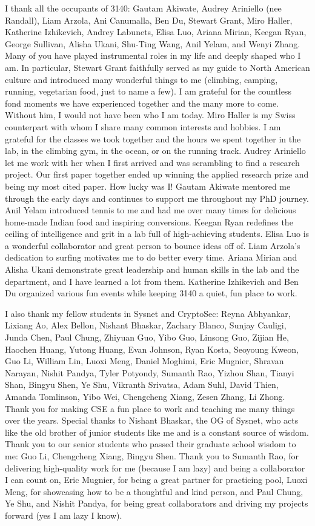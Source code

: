 \documentclass[12pt]{ucsddissertation}
\begin{document}
\begin{acknowledgements}
I thank all the occupants of 3140: Gautam Akiwate, Audrey Ariniello (nee Randall), Liam Arzola, Ani Canumalla, Ben Du, Stewart Grant, Miro Haller, Katherine Izhikevich, Andrey Labunets, Elisa Luo, Ariana Mirian, Keegan Ryan, George Sullivan, Alisha Ukani, Shu-Ting Wang, Anil Yelam, and Wenyi Zhang.
Many of you have played instrumental roles in my life and deeply shaped who I am. In particular, Stewart Grant faithfully served as my guide to North American culture and introduced many wonderful things to me (climbing, camping, running, vegetarian food, just to name a few). I am grateful for the countless fond moments we have experienced together and the many more to come. Without him, I would not have been who I am today. Miro Haller is my Swiss counterpart with whom I share many common interests and hobbies. I am grateful for the classes we took together and the hours we spent together in the lab, in the climbing gym, in the ocean, or on the running track. Audrey Ariniello let me work with her when I first arrived and was scrambling to find a research project. Our first paper together ended up winning the applied research prize and being my most cited paper. How lucky was I! Gautam Akiwate mentored me through the early days and continues to support me throughout my PhD journey. Anil Yelam introduced tennis to me and had me over many times for delicious home-made Indian food and inspiring conversions. Keegan Ryan redefines the ceiling of intelligence and grit in a lab full of high-achieving students. Elisa Luo is a wonderful collaborator and great person to bounce ideas off of. Liam Arzola's dedication to surfing motivates me to do better every time. Ariana Mirian and Alisha Ukani demonstrate great leadership and human skills in the lab and the department, and I have learned a lot from them. Katherine Izhikevich and Ben Du organized various fun events while keeping 3140 a quiet, fun place to work.

I also thank my fellow students in Sysnet and CryptoSec:   Reyna Abhyankar, Lixiang Ao, Alex Bellon, Nishant Bhaskar, Zachary Blanco, Sunjay Cauligi, Junda Chen, Paul Chung, Zhiyuan Guo, Yibo Guo, Linsong Guo, Zijian He, Haochen Huang, Yutong Huang, Evan Johnson, Ryan Kosta, Seoyoung Kweon, Guo Li, William Lin, Luoxi Meng, Daniel Moghimi, Eric Mugnier, Shravan Narayan, Nishit Pandya, Tyler Potyondy, Sumanth Rao, Yizhou Shan, Tianyi Shan, Bingyu Shen, Ye Shu, Vikranth Srivatsa, Adam Suhl, David Thien, Amanda Tomlinson, Yibo Wei, Chengcheng Xiang, Zesen Zhang, Li Zhong. Thank you for making CSE a fun place to work and teaching me many things over the years. Special thanks to Nishant Bhaskar, the OG of Sysnet, who acts like the old brother of junior students like me and is a constant source of wisdom. Thank you to our senior students who passed their graduate school wisdom to me: Guo Li, Chengcheng Xiang, Bingyu Shen. Thank you to Sumanth Rao, for delivering high-quality work for me (because I am lazy) and being a collaborator I can count on, Eric Mugnier, for being a great partner for practicing pool, 
Luoxi Meng, for showcasing how to be a thoughtful and kind person, and Paul Chung, Ye Shu, and Nishit Pandya, for being great collaborators and driving my projects forward (yes I am lazy I know).


\end{acknowledgements}
\end{document}
